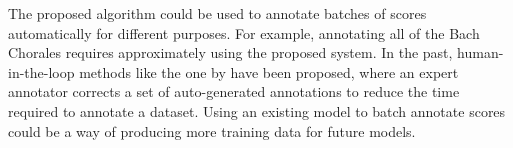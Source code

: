
The proposed algorithm could be used to annotate batches of
scores automatically for different purposes. For example,
annotating all of the Bach Chorales requires approximately
 using the proposed system.
In the past, human-in-the-loop methods like the one by
\textcite{ju2019interactive} have been proposed, where an
expert annotator corrects a set of auto-generated
annotations to reduce the time required to annotate a
dataset. Using an existing model to batch annotate scores
could be a way of producing more training data for future
models.
